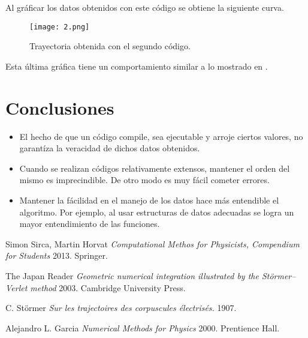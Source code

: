 \documentclass[10pt,twocolumn]{article}
\begin{document}
Al gráficar los datos obtenidos con este código se obtiene la siguiente curva.
\begin{figure}[H]
\label{fig:2}
  \texttt{[image: 2.png]}
  \caption{Trayectoria obtenida con el segundo código.}
\end{figure}
Esta última gráfica tiene un comportamiento similar a lo mostrado en \cite{traj}.

\section{Conclusiones}
\begin{itemize}
\item El hecho de que un código compile, sea ejecutable y arroje ciertos valores, no garantíza la veracidad de dichos datos obtenidos.
\item Cuando se realizan códigos relativamente extensos, mantener el orden del mismo es imprecindible. De otro modo es muy fácil cometer errores.
\item Mantener la fácilidad en el manejo de los datos hace más entendible el algoritmo. Por ejemplo, al usar estructuras de datos adecuadas se logra un mayor entendimiento de las funciones.
\end{itemize}



\begin{thebibliography}{1}

   Simon Sirca, Martin Horvat {\em Computational Methos for Physicists, Compendium for Students}  2013. Springer.

    The Japan Reader {\em Geometric numerical integration
illustrated by the Störmer–Verlet method} 2003.
  Cambridge University Press.
  
  
    C. Störmer {\em Sur les trajectoires des corpuscules électrisés.} 1907.

  
    Alejandro L. Garcia {\em Numerical Methods for Physics} 2000. 
  Prentience Hall.

  

  \end{thebibliography}
\end{document}
